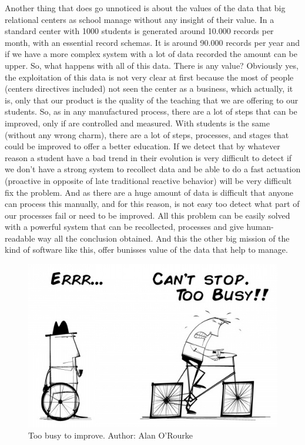 Another thing that does go unnoticed is about the values of the data that big
relational centers as school manage without any insight of their value.
In a standard center with 1000 students is generated around 10.000 records per
month, with an essential record schemas.
\intro
It is around 90.000 records per year
and if we have a more complex system with a lot of data recorded the amount can be upper.
So, what happens with all of this data. There is any value? Obviously yes,
the exploitation of this data is not very clear at first because the most of
people (centers directives included) not seen the center as a business, which
actually, it is, only that our product is the quality of the teaching that we are
offering to our students.
\intro
So, as in any manufactured process, there are a lot of steps that can be improved,
only if are controlled and measured. With students is the same (without any wrong
charm), there are a lot of steps, processes, and stages that could be improved to
offer a better education.
If we detect that by whatever reason a student have a bad trend in their evolution
is very difficult to detect if we don't have a strong system to recollect data
and be able to do a fast actuation (proactive in opposite of late traditional
reactive behavior) will be very difficult fix the problem.
\intro
And as there are a huge amount of data is difficult that anyone can process this
manually, and for this reason, is not easy too detect what part of our processes
fail or need to be improved.
All this problem can be easily solved with a powerful system that can be recollected,
processes and give human-readable way all the conclusion obtained.
\intro
And this the other big mission of the kind of software like this, offer bunisses
value of the data that help to manage.

\begin{figure}[H]
  \includegraphics[scale=0.5]{img/toobusytoimprove.jpeg}
  \centering
  \caption{Too busy to improve. Author: Alan O'Rourke}
\end{figure}


